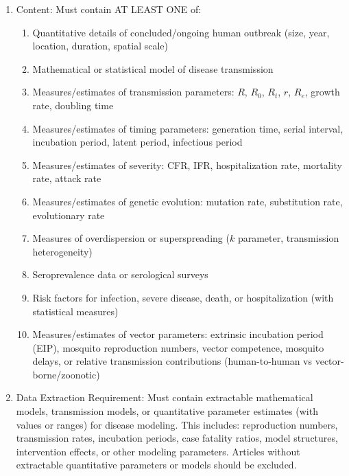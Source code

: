 \begin{tcolorbox}[
    enhanced,
    colback=green!5,
    colframe=green!20,
    boxrule=0pt,
    leftrule=3pt,
    arc=0pt,
    left=6pt, right=6pt, top=4pt, bottom=4pt
]
{\begin{enumerate}[leftmargin=*, itemsep=-3pt, topsep=2pt]
    \item {Content:} Must contain AT LEAST ONE of:
    \begin{enumerate}[label=(\alph*), leftmargin=*, itemsep=-1pt]
        \item Quantitative details of concluded/ongoing human outbreak (size, year, location, duration, spatial scale)
        \item Mathematical or statistical model of disease transmission
        \item Measures/estimates of transmission parameters: $R$, $R_0$, $R_t$, $r$, $R_e$, growth rate, doubling time
        \item Measures/estimates of timing parameters: generation time, serial interval, incubation period, latent period, infectious period
        \item Measures/estimates of severity: CFR, IFR, hospitalization rate, mortality rate, attack rate
        \item Measures/estimates of genetic evolution: mutation rate, substitution rate, evolutionary rate
        \item Measures of overdispersion or superspreading ($k$ parameter, transmission heterogeneity)
        \item Seroprevalence data or serological surveys
        \item Risk factors for infection, severe disease, death, or hospitalization (with statistical measures)
        \item Measures/estimates of vector parameters: extrinsic incubation period (EIP), mosquito reproduction numbers, vector competence, mosquito delays, or relative transmission contributions (human-to-human vs vector-borne/zoonotic)
    \end{enumerate}


    
    \item
    {Data Extraction Requirement:} Must contain extractable mathematical models, transmission models, or quantitative parameter estimates (with values or ranges) for disease modeling. This includes: reproduction numbers, transmission rates, incubation periods, case fatality ratios, model structures, intervention effects, or other modeling parameters. Articles without extractable quantitative parameters or models should be excluded.
\end{enumerate}}
\end{tcolorbox}

